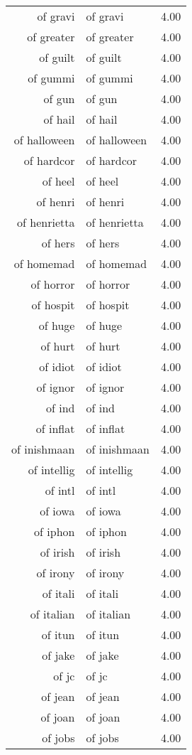 \begin{table}[ht]
\begin{tabular}{rlr}
  of gravi & of gravi & 4.00 \\ 
  of greater & of greater & 4.00 \\ 
  of guilt & of guilt & 4.00 \\ 
  of gummi & of gummi & 4.00 \\ 
  of gun & of gun & 4.00 \\ 
  of hail & of hail & 4.00 \\ 
  of halloween & of halloween & 4.00 \\ 
  of hardcor & of hardcor & 4.00 \\ 
  of heel & of heel & 4.00 \\ 
  of henri & of henri & 4.00 \\ 
  of henrietta & of henrietta & 4.00 \\ 
  of hers & of hers & 4.00 \\ 
  of homemad & of homemad & 4.00 \\ 
  of horror & of horror & 4.00 \\ 
  of hospit & of hospit & 4.00 \\ 
  of huge & of huge & 4.00 \\ 
  of hurt & of hurt & 4.00 \\ 
  of idiot & of idiot & 4.00 \\ 
  of ignor & of ignor & 4.00 \\ 
  of ind & of ind & 4.00 \\ 
  of inflat & of inflat & 4.00 \\ 
  of inishmaan & of inishmaan & 4.00 \\ 
  of intellig & of intellig & 4.00 \\ 
  of intl & of intl & 4.00 \\ 
  of iowa & of iowa & 4.00 \\ 
  of iphon & of iphon & 4.00 \\ 
  of irish & of irish & 4.00 \\ 
  of irony & of irony & 4.00 \\ 
  of itali & of itali & 4.00 \\ 
  of italian & of italian & 4.00 \\ 
  of itun & of itun & 4.00 \\ 
  of jake & of jake & 4.00 \\ 
  of jc & of jc & 4.00 \\ 
  of jean & of jean & 4.00 \\ 
  of joan & of joan & 4.00 \\ 
  of jobs & of jobs & 4.00 \\ 

\end{tabular}
\end{table}
